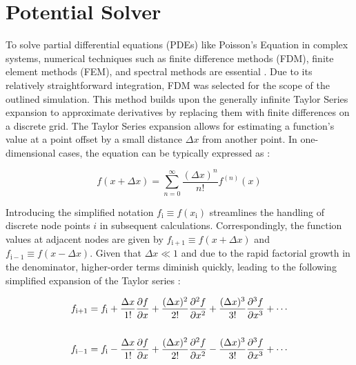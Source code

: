 \section{Potential Solver}\label{Sec: potential solver}

To solve partial differential equations (\acs{PDE}s) like Poisson’s Equation in complex systems, numerical techniques such as finite difference methods (\acs{FDM}), finite element methods (\acs{FEM}), and spectral methods are essential \cite{brieda_plasma_2019}. Due to its relatively straightforward integration, \acs{FDM} was selected for the scope of the outlined simulation. This method builds upon the generally infinite Taylor Series expansion to approximate derivatives by replacing them with finite differences on a discrete grid. The Taylor Series expansion allows for estimating a function's value at a point offset by a small distance $\Delta x$ from another point. In one-dimensional cases, the equation can be typically expressed as \cite{arfken_mathematical_2013}:

\begin{equation}
f(x + \Delta x) = \sum_{n=0}^{\infty} \frac{(\Delta x)^n}{n!} f^{(n)}(x)
\end{equation}

Introducing the simplified notation $f_\mathrm{i} \equiv f(x_\mathrm{i})$ streamlines the handling of discrete node points $i$ in subsequent calculations. Correspondingly, the function values at adjacent nodes are given by $f_\mathrm{i+1} \equiv f(x + \Delta x)$ and $f_\mathrm{i-1} \equiv f(x - \Delta x)$. Given that $\Delta x \ll 1$ and due to the rapid factorial growth in the denominator, higher-order terms diminish quickly, leading to the following simplified expansion of the Taylor series \cite{brieda_plasma_2019}:


\begin{align}
\label{Eq: Taylor i+1}f_{\mathrm{i+1}} &= f_{\mathrm{i}} + \frac{\Delta x}{1!}\frac{\partial f}{\partial x} + \frac{(\Delta x)^2}{2!}\frac{\partial^2 f}{\partial x^2} + \frac{(\Delta x)^3}{3!}\frac{\partial^3 f}{\partial x^3} + \cdots\\
\nonumber\\\vspace{-2.5cm}
\label{Eq: Taylor i-1}f_{\mathrm{i-1}} &= f_{\mathrm{i}} - \frac{\Delta x}{1!}\frac{\partial f}{\partial x} + \frac{(\Delta x)^2}{2!}\frac{\partial^2 f}{\partial x^2} - \frac{(\Delta x)^3}{3!}\frac{\partial^3 f}{\partial x^3} + \cdots
\end{align}

